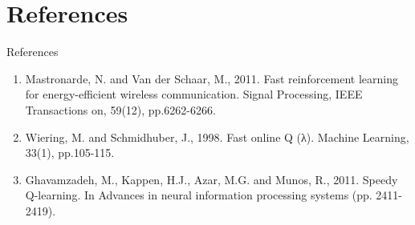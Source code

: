 \documentclass{beamer}
\begin{document}
\section{References}
\begin{frame}{References}
\begin{enumerate}
\item Mastronarde, N. and Van der Schaar, M., 2011. Fast reinforcement learning for energy-efficient wireless communication. Signal Processing, IEEE Transactions on, 59(12), pp.6262-6266.
\item Wiering, M. and Schmidhuber, J., 1998. Fast online Q (λ). Machine Learning, 33(1), pp.105-115.
\item Ghavamzadeh, M., Kappen, H.J., Azar, M.G. and Munos, R., 2011. Speedy Q-learning. In Advances in neural information processing systems (pp. 2411-2419).
\end{enumerate}
\end{frame}
\end{document}
